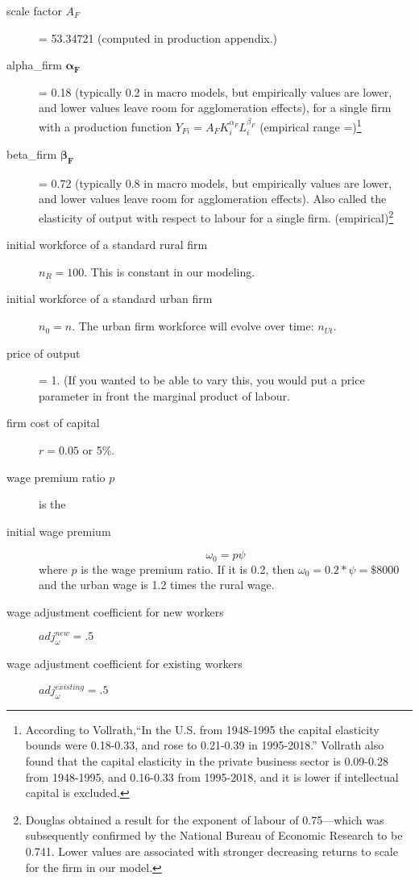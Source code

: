 \begin{description}

\item [scale factor $A_F$] = 53.34721 (computed in production appendix.)

\item  [alpha\_firm  $\mathbf{\alpha_F}$] = 0.18 (typically 0.2 in macro models, but empirically values are lower, and lower values leave room for agglomeration effects),  for a single firm with a production function $Y_{Fi}=A_F K_i^{\alpha_F }L^{\beta_F}_i$ (empirical range =)\footnote{According to Vollrath,``In the U.S. from 1948-1995 the capital elasticity bounds were 0.18-0.33, and rose to 0.21-0.39 in 1995-2018.''\cite{vollrathElasticityAggregateOutput2021} Vollrath also found that the capital elasticity in the private business sector is 0.09-0.28 from 1948-1995, and 0.16-0.33 from 1995-2018, and it is lower if intellectual capital is excluded.}

\item  [beta\_firm $\mathbf{\beta_F}$] = 0.72 (typically 0.8 in macro models, but empirically values are lower, and lower values leave room for agglomeration effects). Also called the elasticity of output with respect to labour for a single firm. (empirical)\footnote{Douglas  obtained a result for the exponent of labour of 0.75—which was subsequently confirmed by the National Bureau of Economic Research to be 0.741. Lower values  are associated with stronger decreasing returns to scale for the firm in our model.} 
\item [initial workforce of a standard rural firm] $n_R=100$. This is constant in our modeling. 

\item [initial workforce of a standard urban firm] $n_0=n$.  The urban firm workforce will evolve over time: $n_{Ut}$. 

\item [price of output] = 1. (If you wanted to be able to vary this, you would put a price parameter in front the %
\gls{marginal product of labour}. %

\item [firm cost of capital] $r = 0.05$ or 5\%.
\item[wage premium ratio $p$] is the 
\item [initial wage premium]  
\[\omega_0 = p \psi\] 
where $p$ is the wage premium ratio. If it is 0.2, then $\omega_0= 0.2*\psi =\$8000$ and the urban wage is 1.2 times the rural wage.

\item [wage adjustment coefficient for new workers ] $adj^{new}_\omega=.5$

\item [wage adjustment coefficient for existing workers] $adj^{existing}_\omega=.5$
\end{description}
    

